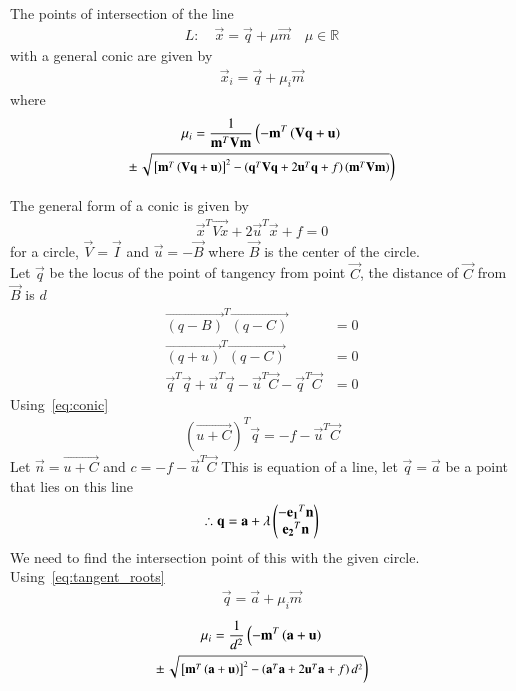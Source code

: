 \documentclass[journal,12pt,twocolumn]{IEEEtran}
\begin{document}
\begin{theorem}
  The points of intersection of the line 
\begin{align}
L: \quad \vec{x} = \vec{q} + \mu \vec{m} \quad \mu \in \mathbb{R}
\label{eq:conic_tangent}
\end{align}
with a general conic are given by
\begin{align}
\vec{x}_i = \vec{q} + \mu_i \vec{m}
\end{align}
%
where
\begin{multline}
\mu_i = \frac{1}
{
\mathbf{m}^T\mathbf{V}\mathbf{m}
}
\left(-\mathbf{m}^T\left(\mathbf{V}\mathbf{q}+\mathbf{u}\right)\right.
\\
\pm
{\small
\ensuremath{\left.\sqrt{
{}\left[
\mathbf{m}^T\left(\mathbf{V}\mathbf{q}+\mathbf{u}\right)
\right]^2
-
\left(
\mathbf{q}^T\mathbf{V}\mathbf{q} + 2\mathbf{u}^T\mathbf{q} +f
\right)
\left(\mathbf{m}^T\mathbf{V}\mathbf{m}\right)
}
\right)}
}
\label{eq:tangent_roots}
\end{multline}
\end{theorem}
The general form of a conic is given by
\begin{align}
  \vec{x}^T\vec{Vx}+2\vec{u}^T\vec{x}+f=0 \label{eq:conic}
\end{align}
for a circle, $\vec{V}=\vec{I}$ and $\vec{u}=-\vec{B}$ where $\vec{B}$ is the center of the circle.\\
Let $\vec{q}$ be the locus of the point of tangency from point $\vec{C}$, the distance of $\vec{C}$ from $\vec{B}$ is $d$ 
\begin{align}
  \vec{(q-B)}^T\vec{(q-C)}&=0\\
  \vec{(q+u)}^T\vec{(q-C)}&=0\\
  \vec{q}^T\vec{q}+\vec{u}^T\vec{q}-\vec{u}^T\vec{C}-\vec{q}^T\vec{C}&=0
\end{align} 
Using~\eqref{eq:conic}
\begin{align}
  (\vec{u+C})^T\vec{q}=-f-\vec{u}^T\vec{C}
\end{align}
Let $\vec{n}=\vec{u+C}$ and $c=-f-\vec{u}^T\vec{C}$
This is equation of a line, let $\vec{q}=\vec{a}$ be a point that lies on this line
\begin{align}
  \therefore \mathbf{q}=\mathbf{a}+\lambda\begin{pmatrix}-\mathbf{e_1}^T\mathbf{n}\\\mathbf{e_2}^T\mathbf{n}\end{pmatrix}
\end{align}
We need to find the intersection point of this with the given circle.\\
Using~\eqref{eq:tangent_roots}
\begin{align}
  \vec{q} = \vec{a} + \mu_i \vec{m}
\end{align}
\begin{multline}
  \mu_i = \frac{1}
  {
  d^2
  }
  \left(-\mathbf{m}^T\left(\mathbf{a}+\mathbf{u}\right)\right.
  \\
  \pm
  {\small
  \ensuremath{\left.\sqrt{
  {}\left[
  \mathbf{m}^T\left(\mathbf{a}+\mathbf{u}\right)
  \right]^2
  -
  \left(
  \mathbf{a}^T\mathbf{a} + 2\mathbf{u}^T\mathbf{a} +f
  \right)
  d^2
  }
  \right)}
  }
\label{eq:sol}
\end{multline}
\end{document}

